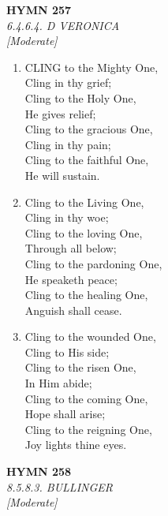 \documentclass[11pt,a4paper]{article}
\begin{document}
\newpage
\begin{center}
    {\Large \textbf{HYMN 257}}
    \\
    \textit{6.4.6.4. D VERONICA}
    \\
    \textit{\small [Moderate]}
\end{center}
\vspace{1em}

\begin{enumerate}
    \item CLING to the Mighty One, \\
            Cling in thy grief; \\
        Cling to the Holy One, \\
            He gives relief; \\
        Cling to the gracious One, \\
            Cling in thy pain; \\
        Cling to the faithful One, \\
            He will sustain.

    \item Cling to the Living One, \\
            Cling in thy woe; \\
        Cling to the loving One, \\
            Through all below; \\
        Cling to the pardoning One, \\
            He speaketh peace; \\
        Cling to the healing One, \\
            Anguish shall cease.

    \item Cling to the wounded One, \\
            Cling to His side; \\
        Cling to the risen One, \\
            In Him abide; \\
        Cling to the coming One, \\
            Hope shall arise; \\
        Cling to the reigning One, \\
            Joy lights thine eyes.

\end{enumerate}

\newpage
\begin{center}
    {\Large \textbf{HYMN 258}}
    \\
    \textit{8.5.8.3. BULLINGER}
    \\
    \textit{\small [Moderate]}
\end{center}
\vspace{1em}
\end{document}
